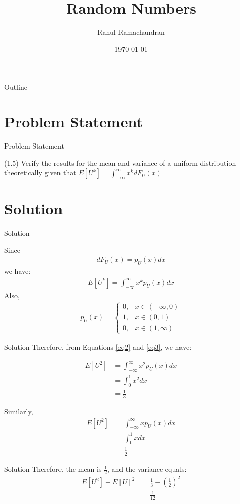 \documentclass{beamer}
\title{Random Numbers}
\author{Rahul Ramachandran}
\date{\today}
\providecommand{\brak}[1]{\ensuremath{\left(#1\right)}}
\begin{document}
\begin{frame}
    \titlepage 
\end{frame}

\logo{}


\begin{frame}{Outline}
    \tableofcontents
\end{frame}



\section{Problem Statement}
\begin{frame}{Problem Statement}
    \begin{block}{(1.5)} Verify the results for the mean and variance of a uniform distribution theoretically given that $E[U^k] = \int_{-\infty}^{\infty}x^k dF_U(x)$
    \end{block}
\end{frame}

\section{Solution}
\begin{frame}{Solution}

Since 
\begin{align}
    dF_U(x) = p_U(x) dx
\end{align}
we have:
\begin{align}
    \label{eq2}
    E[U^k] = \int_{-\infty}^{\infty}x^k p_U(x) dx
\end{align}
Also,
\begin{align}
    \label{eq3}
     p_U(x) = 
    \begin{cases}
        0, & x \in (-\infty,0) \\
        1, & x \in (0,1) \\
        0, & x \in (1, \infty)
    \end{cases}
\end{align}
\end{frame}

\begin{frame}{Solution}
Therefore, from Equations \ref{eq2} and \ref{eq3}, we have:

\begin{align}
    E[U^2] &=  \int_{-\infty}^{\infty}x^2 p_U(x) dx \\
    &= \int_0 ^1 x^2 dx \\
    &= \frac{1}{3}
\end{align}

Similarly, 
\begin{align}
    E[U^2] &=  \int_{-\infty}^{\infty}x p_U(x) dx \\
    &= \int_0 ^1 x dx \\
    &= \frac{1}{2}
\end{align}
\end{frame}

\begin{frame}{Solution}
Therefore, the mean is $\frac{1}{2}$, and the variance equals:
\begin{align}
    E[U^2] - E[U]^2 &= \frac{1}{3} - \brak{\frac{1}{2}}^2 \\
    &= \frac{1}{12}
\end{align}


\end{frame}
\end{document}
